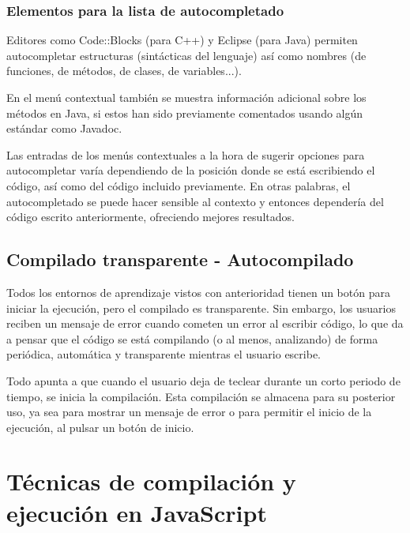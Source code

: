 \documentclass{report}
\begin{document}
	\subsubsection{Elementos para la lista de autocompletado}
	
	Editores como Code::Blocks (para C++) y Eclipse (para Java) permiten autocompletar estructuras (sintácticas del lenguaje) así como nombres (de funciones, de métodos, de clases, de variables...).
	
	\vspace{10px}
	
	En el menú contextual también se muestra información adicional sobre los métodos en Java, si estos han sido previamente comentados usando algún estándar como Javadoc\cite{javadoc}.
	
	\vspace{10px}
	
	Las entradas de los menús contextuales a la hora de sugerir opciones para autocompletar varía dependiendo de la posición donde se está escribiendo el código, así como del código incluido previamente. En otras palabras, el autocompletado se puede hacer sensible al contexto y entonces dependería del código escrito anteriormente, ofreciendo mejores resultados.
	
	\subsection{Compilado transparente - Autocompilado}
	
	Todos los entornos de aprendizaje vistos con anterioridad tienen un botón para iniciar la ejecución, pero el compilado es transparente. Sin embargo, los usuarios reciben un mensaje de error cuando cometen un error al escribir código, lo que da a pensar que el código se está compilando (o al menos, analizando) de forma periódica, automática y transparente mientras el usuario escribe. 
	
	\vspace{10px}
	
	Todo apunta a que cuando el usuario deja de teclear durante un corto periodo de tiempo, se inicia la compilación. Esta compilación se almacena para su posterior uso, ya sea para mostrar un mensaje de error o para permitir el inicio de la ejecución, al pulsar un botón de inicio.
	
	\section{Técnicas de compilación y ejecución en JavaScript}
	
\end{document}
